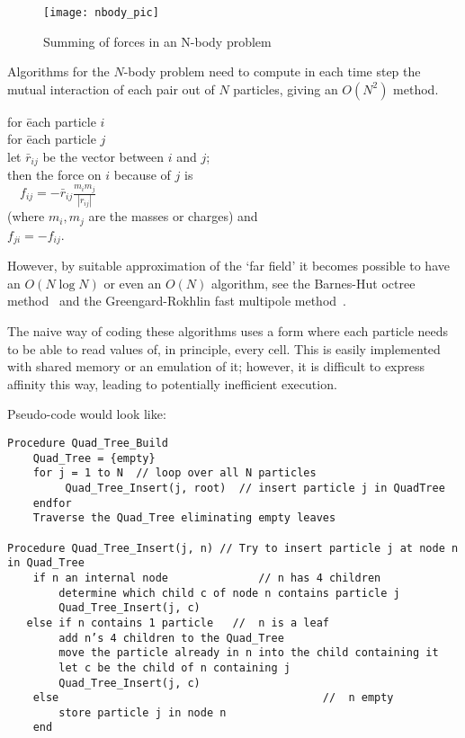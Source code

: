 
\begin{wrapfigure}{r}{2in}
  \texttt{[image: nbody\_pic]}
  \caption{Summing of forces in an N-body problem}
  \label{fig:nbody-sum}
  \vskip-1in
\end{wrapfigure}
%
Algorithms for the $N$-body problem need to compute in each time step
the mutual interaction of each pair out of $N$ particles, giving an
$O(N^2)$ method. 

  \begin{tabbing}
    for \=each particle $i$\\
    \>for \= each particle $j$\\
    \>\> let $\bar r_{ij}$ be the vector between $i$ and $j$;\\
    \>\> then the force on $i$ because of $j$ is\\
    \>\> $\quad f_{ij} = -\bar r_{ij}\frac{m_im_j}{|r_{ij}|}$\\
    \>\> (where $m_i,m_j$ are the masses or charges) and\\
    \>\> $f_{ji}=-f_{ij}$.
  \end{tabbing}

However, by suitable approximation of the `far field'
it becomes possible to have an $O(N\log N)$ or even an $O(N)$
algorithm, see the Barnes-Hut octree method~\cite{BarnesHut} and the
Greengard-Rokhlin fast multipole method~\cite{GreengardRokhlin}.

The naive way of coding these algorithms uses a form where each
particle needs to be able to read values of, in principle, every
cell. 
This is easily implemented with shared memory or an emulation of
it; however, it is difficult to express affinity this way, leading
to potentially inefficient execution.

Pseudo-code would look like:

\begin{verbatim}
Procedure Quad_Tree_Build
    Quad_Tree = {empty}
    for j = 1 to N  // loop over all N particles
         Quad_Tree_Insert(j, root)  // insert particle j in QuadTree
    endfor
    Traverse the Quad_Tree eliminating empty leaves

Procedure Quad_Tree_Insert(j, n) // Try to insert particle j at node n in Quad_Tree
    if n an internal node              // n has 4 children
        determine which child c of node n contains particle j
        Quad_Tree_Insert(j, c)
   else if n contains 1 particle   //  n is a leaf
        add n’s 4 children to the Quad_Tree
        move the particle already in n into the child containing it
        let c be the child of n containing j
        Quad_Tree_Insert(j, c)
    else                                         //  n empty 
        store particle j in node n
    end
\end{verbatim}


